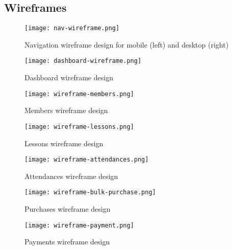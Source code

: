 \subsection{Wireframes}

\begin{figure}[ht!]
    \centerline{\texttt{[image: nav-wireframe.png]}}
    \caption{Navigation wireframe design for mobile (left) and desktop (right)}
    \label{fig:navwireframe}
\end{figure}

\begin{figure}[ht!]
    \centerline{\texttt{[image: dashboard-wireframe.png]}}
    \caption{Dashboard wireframe design}
    \label{fig:dashwire}
\end{figure}

\begin{figure}[ht!]
    \centerline{\texttt{[image: wireframe-members.png]}}
    \caption{Members wireframe design}
    \label{fig:wiremembers}
\end{figure}

\begin{figure}[ht!]
    \centerline{\texttt{[image: wireframe-lessons.png]}}
    \caption{Lessons wireframe design}
    \label{fig:wirelessons}
\end{figure}

\begin{figure}[ht!]
    \centerline{\texttt{[image: wireframe-attendances.png]}}
    \caption{Attendances wireframe design}
    \label{fig:wireattendance}
\end{figure}

\begin{figure}[ht!]
    \centerline{\texttt{[image: wireframe-bulk-purchase.png]}}
    \caption{Purchases wireframe design}
    \label{fig:wirepurchase}
\end{figure}

\begin{figure}[ht!]
    \centerline{\texttt{[image: wireframe-payment.png]}}
    \caption{Payments wireframe design}
    \label{fig:wirepayments}
\end{figure}




